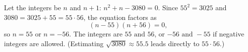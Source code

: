 Let the integers be $n$ and $n+1$: $n^2+n-3080=0$. Since $55^2=3025$ and $3080=3025+55=55\cdot56$, the equation factors as
\[
(n-55)(n+56)=0 ,
\]
so $n=55$ or $n=-56$. The integers are $\boxed{55\text{ and }56}$, or $\boxed{-56\text{ and }-55}$ if negative integers are allowed. (Estimating $\sqrt{3080}\approx55.5$ leads directly to $55\cdot56$.)
